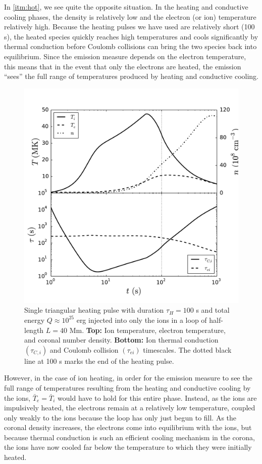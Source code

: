 \documentclass[apj]{emulateapj}
\begin{document}
	\par In \autoref{itm:hot}, we see quite the opposite situation. In the heating and conductive cooling phases, the density is relatively low and the electron (or ion) temperature relatively high. Because the heating pulses we have used are relatively short (100 s), the heated species quickly reaches high temperatures and cools significantly by thermal conduction before Coulomb collisions can bring the two species back into equilibrium. Since the emission measure depends on the electron temperature, this means that in the event that only the electrons are heated, the emission  ``sees'' the full range of temperatures produced by heating and conductive cooling.
	\begin{figure}[t]
		\centering
		\includegraphics[width=\columnwidth]{figures/ion_ts_compare.pdf}
		\caption{Single triangular heating pulse with duration $\tau_H=100$ s and total energy $Q\approx10^{25}$ erg injected into only the ions in a loop of half-length $L=40$ Mm. \textbf{Top:} Ion temperature, electron temperature, and coronal number density. \textbf{Bottom:} Ion thermal conduction $(\tau_{C,i})$ and Coulomb collision $(\tau_{ei})$ timescales. The dotted black line at 100 s marks the end of the heating pulse.}
		\label{fig:ion_ts}
	\end{figure}
	\par However, in the case of ion heating, in order for the emission measure to see the full range of temperatures resulting from the heating and conductive cooling by the ions, $\bar{T}_e=\bar{T}_i$ would have to hold for this entire phase. Instead, as the ions are impulsively heated, the electrons remain at a relatively low temperature, coupled only weakly to the ions because the loop has only just begun to fill. As the coronal density increases, the electrons come into equilibrium with the ions, but because thermal conduction is such an efficient cooling mechanism in the corona, the ions have now cooled far below the temperature to which they were initially heated. 
\end{document}
